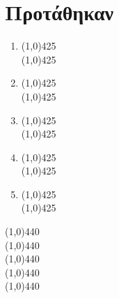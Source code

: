 \section{Προτάθηκαν}
\vspace{1cm}
\begin{Large}
\begin{enumerate}
 \item \line(1,0){425} \\
 \line(1,0){425} \\
 \item \line(1,0){425} \\
 \line(1,0){425} \\
  \item \line(1,0){425} \\
 \line(1,0){425} \\
  \item \line(1,0){425} \\
 \line(1,0){425} \\
  \item \line(1,0){425} \\
 \line(1,0){425} \\

\end{enumerate}
\begin{center}
\line(1,0){440} \\
\line(1,0){440} \\
\line(1,0){440} \\
\line(1,0){440} \\
\line(1,0){440} \\
\end{center}
\end{Large}
\newpage
